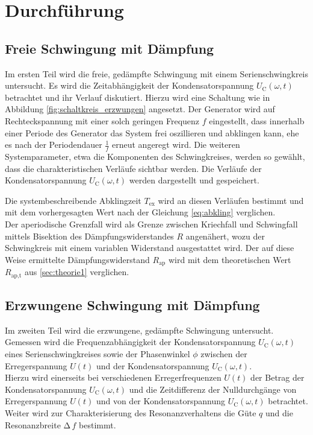\section{Durchführung}
\label{sec:Durchfuehrung}
\subsection{Freie Schwingung mit Dämpfung}
Im ersten Teil wird die freie, gedämpfte Schwingung mit einem Serienschwingkreis untersucht.
Es wird die Zeitabhängigkeit der Kondensatorspannung $U_\mathup{C}(\omega, t)$ betrachtet und ihr Verlauf diskutiert.
Hierzu wird eine Schaltung wie in Abbildung \ref{fig:schaltkreis_erzwungen} angesetzt.
Der Generator wird auf Rechteckspannung mit einer solch geringen Frequenz $f$ eingestellt, dass innerhalb einer Periode des Generator das System frei oszillieren und abklingen kann, ehe es nach der Periodendauer $\frac{1}{f}$ erneut angeregt wird.
Die weiteren Systemparameter, etwa die Komponenten des Schwingkreises, werden so gewählt, dass die charakteristischen Verläufe sichtbar werden. 
Die Verläufe der Kondensatorspannung $U_\mathup{C}(\omega, t)$ werden dargestellt und gespeichert.

Die systembeschreibende Abklingzeit $T_\text{ex}$ wird an diesen Verläufen bestimmt und mit dem vorhergesagten Wert nach der Gleichung \eqref{eq:abkling} verglichen.\\
Der aperiodische Grenzfall wird als Grenze zwischen Kriechfall und Schwingfall mittels Bisektion des Dämpfungswiderstandes $R$ angenähert, wozu der Schwingkreis mit einem variablen Widerstand ausgestattet wird.
Der auf diese Weise ermittelte Dämpfungswiderstand $R_\text{ap}$ wird mit dem theoretischen Wert $R_\text{ap,t}$ aus \ref{sec:theorie1} verglichen.

\subsection{Erzwungene Schwingung mit Dämpfung}
Im zweiten Teil wird die erzwungene, gedämpfte Schwingung untersucht.
Gemessen wird die Frequenzabhängigkeit der Kondensatorspannung $U_\mathup{C}(\omega, t)$ eines Serienschwingkreises sowie der Phasenwinkel $\phi$ zwischen der Erregerspannung $U(t)$ und der Kondensatorspannung $U_\mathup{C}(\omega, t)$.\\
Hierzu wird einerseits bei verschiedenen Erregerfrequenzen $U(t)$  der Betrag der Kondensatorspannung $U_\mathup{C}(\omega, t)$ und die Zeitdifferenz der Nulldurchgänge von Erregerspannung $U(t)$ und von der Kondensatorspannung $U_\mathup{C}(\omega, t)$ betrachtet.
Weiter wird zur Charakterisierung des Resonanzverhaltens die Güte $q$ und die Resonanzbreite $\mathup{\Delta}\, f$ bestimmt.

